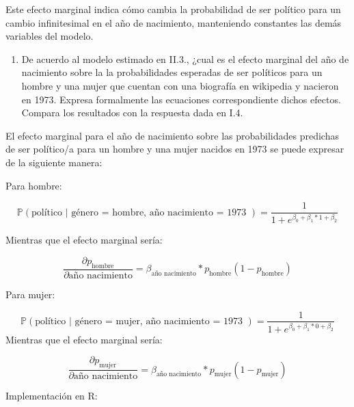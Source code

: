 \documentclass[
  12pt,
  a4paper,
]{article}
\providecommand{\tightlist}{%
  \setlength{\itemsep}{0pt}\setlength{\parskip}{0pt}}
\begin{document}
Este efecto marginal indica cómo cambia la probabilidad de ser político para un cambio infinitesimal en el año de nacimiento, manteniendo constantes las demás variables del modelo.

\begin{enumerate}
\def\labelenumi{\arabic{enumi}.}
\setcounter{enumi}{4}
\tightlist
\item
  De acuerdo al modelo estimado en II.3., ¿cual es el efecto marginal del año de nacimiento sobre la la probabilidades esperadas de ser políticos para un hombre y una mujer que cuentan con una biografía en wikipedia y nacieron en 1973. Expresa formalmente las ecuaciones correspondiente dichos efectos. Compara los resultados con la respuesta dada en I.4.
\end{enumerate}

El efecto marginal para el año de nacimiento sobre las probabilidades predichas de ser político/a para un hombre y una mujer nacidos en 1973 se puede expresar de la siguiente manera:

Para hombre:

\[
\mathbb{P}(\text{político | género = hombre, año nacimiento = 1973 }) = \frac{1}{1+e^{\beta_{0} + \beta_{1}*1 + \beta_{2}}} 
\]

Mientras que el efecto marginal sería:

\[\frac{\partial p_\text{hombre}}{\partial\text{año nacimiento}} = \beta_\text{año nacimiento} * p_\text{hombre}(1-p_\text{hombre})
\]

Para mujer:

\[
\mathbb{P}(\text{político | género = mujer, año nacimiento = 1973 }) = \frac{1}{1+e^{\beta_{0} + \beta_{1}*0 + \beta_{2}}} 
\]
Mientras que el efecto marginal sería:

\[\frac{\partial p_\text{mujer}}{\partial\text{año nacimiento}} = \beta_\text{año nacimiento} * p_\text{mujer}(1-p_\text{mujer})
\]

Implementación en R:
\end{document}
